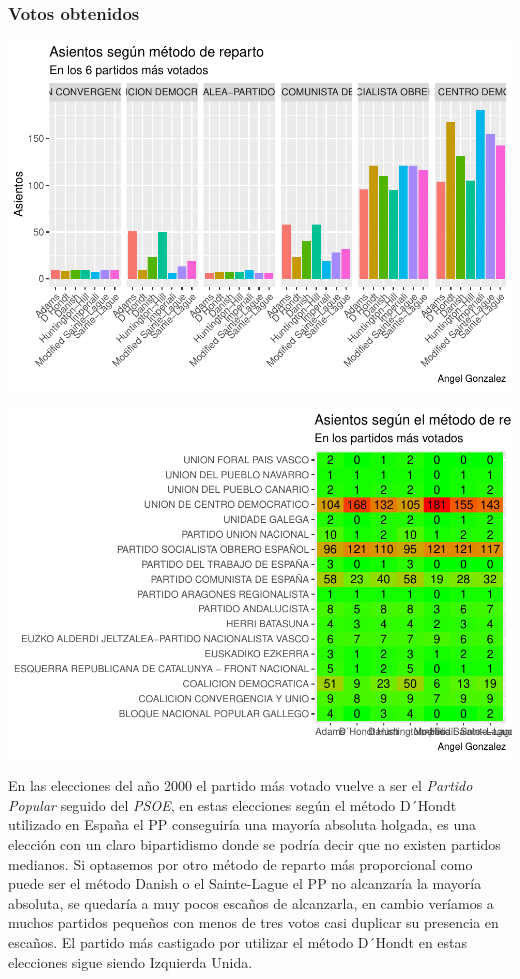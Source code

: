 \documentclass[12pt,a4paper,]{book}
\numberwithin{dummy}{section}
\theoremstyle{ocrenumbox}
\theoremstyle{blacknumex}
\theoremstyle{blacknumbox}
\theoremstyle{ocrenum}
\theoremstyle{ocrenum}
\begin{document}
\hypertarget{votos-obtenidos-7}{%
\subsubsection{Votos obtenidos}\label{votos-obtenidos-7}}

\begin{center}\includegraphics[width=0.95\linewidth]{figurasR/unnamed-chunk-74-1} \end{center}

\begin{center}\includegraphics[width=0.95\linewidth]{figurasR/unnamed-chunk-74-2} \end{center}

En las elecciones del año 2000 el partido más votado vuelve a ser el
\emph{Partido Popular} seguido del \emph{PSOE}, en estas elecciones
según el método D´Hondt utilizado en España el PP conseguiría una
mayoría absoluta holgada, es una elección con un claro bipartidismo
donde se podría decir que no existen partidos medianos. Si optasemos por
otro método de reparto más proporcional como puede ser el método Danish
o el Sainte-Lague el PP no alcanzaría la mayoría absoluta, se quedaría a
muy pocos escaños de alcanzarla, en cambio veríamos a muchos partidos
pequeños con menos de tres votos casi duplicar su presencia en escaños.
El partido más castigado por utilizar el método D´Hondt en estas
elecciones sigue siendo Izquierda Unida.
\end{document}
